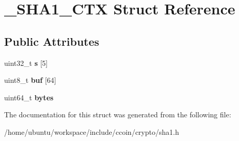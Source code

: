 \hypertarget{struct__SHA1__CTX}{\section{\-\_\-\-S\-H\-A1\-\_\-\-C\-T\-X Struct Reference}
\label{struct__SHA1__CTX}
}
\subsection*{Public Attributes}
\begin{DoxyCompactItemize}
\item 
\hypertarget{struct__SHA1__CTX_a96da7459ae9f976d7381e69c911b90c6}{uint32\-\_\-t {\bfseries s} \mbox{[}5\mbox{]}}\label{struct__SHA1__CTX_a96da7459ae9f976d7381e69c911b90c6}

\item 
\hypertarget{struct__SHA1__CTX_aeaba6977421136b2c1c9bf23fd9b1467}{uint8\-\_\-t {\bfseries buf} \mbox{[}64\mbox{]}}\label{struct__SHA1__CTX_aeaba6977421136b2c1c9bf23fd9b1467}

\item 
\hypertarget{struct__SHA1__CTX_ab5522a7bbf69f446853ffc3a0913cfdb}{uint64\-\_\-t {\bfseries bytes}}\label{struct__SHA1__CTX_ab5522a7bbf69f446853ffc3a0913cfdb}

\end{DoxyCompactItemize}


The documentation for this struct was generated from the following file\-:\begin{DoxyCompactItemize}
\item 
/home/ubuntu/workspace/include/ccoin/crypto/sha1.\-h\end{DoxyCompactItemize}
